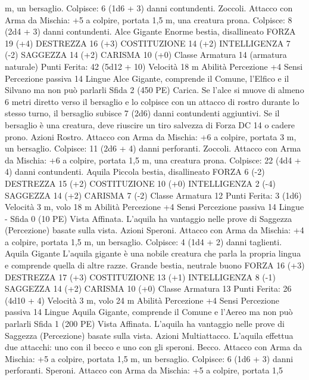 \begin{multicols}{2}
m, un bersaglio.
Colpisce: 6 (1d6 + 3) danni contundenti.
Zoccoli. Attacco con Arma da Mischia: +5 a colpire, portata 1,5
m, una creatura prona.
Colpisce: 8 (2d4 + 3) danni contundenti.
Alce Gigante
Enorme bestia, disallineato
FORZA 19 (+4)
DESTREZZA 16 (+3)
COSTITUZIONE 14 (+2)
INTELLIGENZA 7 (-2)
SAGGEZZA 14 (+2)
CARISMA 10 (+0)
Classe Armatura 14 (armatura naturale)
\hspace*{0pt}\hfill{Punti Ferita}: 42 (5d12 + 10)
Velocità 18 m
Abilità Percezione +4
Sensi Percezione passiva 14
Lingue Alce Gigante, comprende il Comune, l’Elfico e il
Silvano ma non può parlarli
Sfida 2 (450 PE)
Carica. Se l’alce si muove di almeno 6 metri diretto verso il
bersaglio e lo colpisce con un attacco di rostro durante lo stesso
turno, il bersaglio subisce 7 (2d6) danni contundenti aggiuntivi.
Se il bersaglio è una creatura, deve riuscire un tiro salvezza di
Forza DC 14 o cadere prono.
Azioni
Rostro. Attacco con Arma da Mischia: +6 a colpire, portata 3 m,
un bersaglio.
Colpisce: 11 (2d6 + 4) danni perforanti.
Zoccoli. Attacco con Arma da Mischia: +6 a colpire, portata 1,5
m, una creatura prona.
Colpisce: 22 (4d4 + 4) danni contundenti.
Aquila
Piccola bestia, disallineato
FORZA 6 (-2)
DESTREZZA 15 (+2)
COSTITUZIONE 10 (+0)
INTELLIGENZA 2 (-4)
SAGGEZZA 14 (+2)
CARISMA 7 (-2)
Classe Armatura 12
\hspace*{0pt}\hfill{Punti Ferita}: 3 (1d6)
Velocità 3 m, volo 18 m
Abilità Percezione +4
Sensi Percezione passiva 14
Lingue -
Sfida 0 (10 PE)
Vista Affinata. L’aquila ha vantaggio nelle prove di Saggezza
(Percezione) basate sulla vista.
Azioni
Speroni. Attacco con Arma da Mischia: +4 a colpire, portata 1,5
m, un bersaglio.
Colpisce: 4 (1d4 + 2) danni taglienti.
Aquila Gigante
L’aquila gigante è una nobile creatura che parla la
propria lingua e comprende quella di altre razze.
Grande bestia, neutrale buono
FORZA 16 (+3)
DESTREZZA 17 (+3)
COSTITUZIONE 13 (+1)
INTELLIGENZA 8 (-1)
SAGGEZZA 14 (+2)
CARISMA 10 (+0)
Classe Armatura 13
\hspace*{0pt}\hfill{Punti Ferita}: 26 (4d10 + 4)
Velocità 3 m, volo 24 m
Abilità Percezione +4
Sensi Percezione passiva 14
Lingue Aquila Gigante, comprende il Comune e l’Aereo ma non
può parlarli
Sfida 1 (200 PE)
Vista Affinata. L’aquila ha vantaggio nelle prove di Saggezza
(Percezione) basate sulla vista.
Azioni
Multiattacco. L’aquila effettua due attacchi: uno con il becco e
uno con gli speroni.
Becco. Attacco con Arma da Mischia: +5 a colpire, portata 1,5
m, un bersaglio.
Colpisce: 6 (1d6 + 3) danni perforanti.
Speroni. Attacco con Arma da Mischia: +5 a colpire, portata 1,5

\end{multicols}
